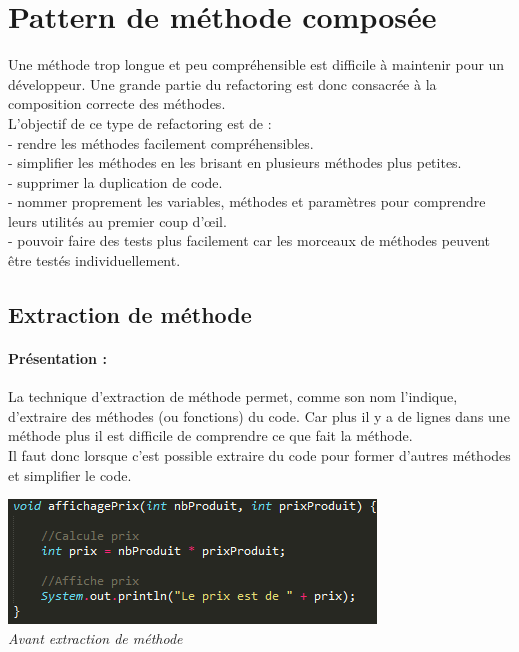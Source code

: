 \documentclass[a4paper,twoside,12pt,openright]{report}
\begin{document}
\section{Pattern de méthode composée}
Une méthode trop longue et peu compréhensible est difficile à maintenir pour un développeur.
Une grande partie du refactoring est donc consacrée à la composition correcte des méthodes.\cite{ref5}\\

L'objectif de ce type de refactoring est de :\\
- rendre les méthodes facilement compréhensibles.\\
- simplifier les méthodes en les brisant en plusieurs méthodes plus petites.\\
- supprimer la duplication de code.\\
- nommer proprement les variables, méthodes et paramètres pour comprendre leurs utilités au premier coup d'œil.\\
- pouvoir faire des tests plus facilement car les morceaux de méthodes peuvent être testés individuellement.\cite{ref6}

\newpage

\subsection{Extraction de méthode}
\paragraph{Présentation :} 
La technique d'extraction de méthode permet, comme son nom l'indique, d'extraire des méthodes (ou fonctions) du code. Car plus il y a de lignes dans une méthode plus il est difficile de comprendre ce que fait la méthode.\\
Il faut donc lorsque c'est possible extraire du code pour former d'autres méthodes et simplifier le code.
\begin{center}
\includegraphics[scale=1]{Image/Extraction_Methode.png}\\
\itshape{Avant extraction de méthode}
\end{center}
\end{document}
